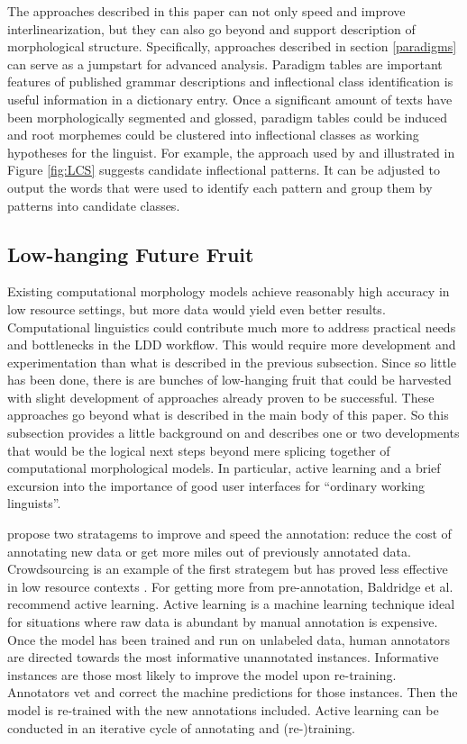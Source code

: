 \documentclass[12pt]{article}
\begin{document}
The approaches described in this paper can not only speed and improve interlinearization, but they can also go beyond and support description of morphological structure. Specifically, approaches described in section \ref{paradigms} can serve as a jumpstart for advanced analysis. Paradigm tables are important features of published grammar descriptions and inflectional class identification is useful information in a dictionary entry. Once a significant amount of texts have been morphologically segmented and glossed, paradigm tables could be induced and root morphemes could be clustered into inflectional classes as working hypotheses for the linguist. For example, the approach used by  and illustrated in Figure \ref{fig:LCS} suggests candidate inflectional patterns. It can be adjusted to output the words that were used to identify each pattern and group them by patterns into candidate classes. 

\subsection{Low-hanging Future Fruit }
Existing computational morphology models achieve reasonably high accuracy in low resource settings, but more data would yield even better results. Computational linguistics could contribute much more to address practical needs and bottlenecks in the LDD workflow. This would require more development and experimentation than what is described in the previous subsection. Since so little has been done, there is are bunches of low-hanging fruit that could be harvested with slight development of approaches already proven to be successful. These approaches go beyond what is described in the main body of this paper. So this subsection provides a little background on and describes one or two developments that would be the logical next steps beyond mere splicing together of computational morphological models. In particular, active learning and a brief excursion into the importance of good user interfaces for ``ordinary working linguists''.

 propose two stratagems to improve and speed the annotation: reduce the cost of annotating new data or get more miles out of previously annotated data. Crowdsourcing is an example of the first strategem but has proved less effective in low resource contexts \cite{bird_aikuma:_2014,bettinson_developing_2017}. For getting more from pre-annotation, Baldridge et al. recommend active learning. Active learning is a machine learning technique ideal for situations where raw data is abundant by manual annotation is expensive. Once the model has been trained and run on unlabeled data, human annotators are directed towards the most informative unannotated instances. Informative instances are those most likely to improve the model upon re-training. Annotators vet and correct the machine predictions for those instances. Then the model is re-trained with the new annotations included. Active learning can be conducted in an iterative cycle of annotating and (re-)training. 
\end{document}
